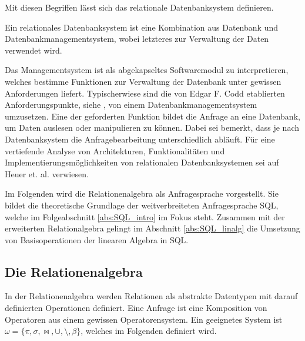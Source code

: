 Mit diesen Begriffen lässt sich das relationale Datenbanksystem definieren.

\begin{defi}
    Ein relationales Datenbanksystem ist eine Kombination aus Datenbank und Datenbankmanagementsystem, wobei letzteres zur Verwaltung der Daten verwendet wird.
\end{defi}

Das Managementsystem ist als abgekapseltes Softwaremodul zu interpretieren, welches bestimme Funktionen zur Verwaltung der Datenbank unter gewissen Anforderungen liefert. Typischerwiese sind die von Edgar F. Codd etablierten Anforderungspunkte, siehe \cite{DBLP:books/daglib/0044627}, von einem Datenbankmanagementsystem umzusetzen. Eine der geforderten Funktion bildet die Anfrage an eine Datenbank, um Daten auslesen oder manipulieren zu können. Dabei sei bemerkt, dass je nach Datenbanksystem die Anfragebearbeitung unterschiedlich abläuft. Für eine vertiefende Analyse von Architekturen, Funktionalitäten und Implementierungsmöglichkeiten von relationalen Datenbanksystemen sei auf Heuer et. al.\cite{DBLP:books/mitp/HSS19, DBLP:books/daglib/0044627} verwiesen. 

Im Folgenden wird die Relationenalgebra als Anfragesprache vorgestellt. Sie bildet die theoretische Grundlage der weitverbreiteten Anfragesprache SQL, welche im Folgeabschnitt \ref{abs:SQL_intro} im Fokus steht. Zusammen mit der erweiterten Relationalgebra gelingt im Abschnitt \ref{abs:SQL_linalg} die Umsetzung von Basisoperationen der linearen Algebra in SQL.

\subsection{Die Relationenalgebra}
\label{abs:rela_algebra}
In der Relationenalgebra werden Relationen als abstrakte Datentypen mit darauf definierten Operationen definiert. Eine Anfrage ist eine Komposition von Operatoren aus einem gewissen Operatorensystem. Ein geeignetes System ist $\omega= \{ \pi, \sigma, \bowtie, \cup, \setminus, \beta \}$, welches im Folgenden definiert wird.


